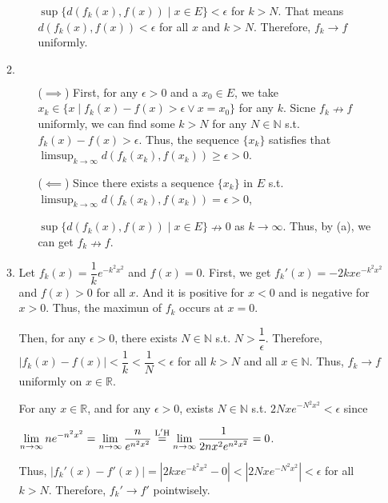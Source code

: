 \documentclass[12pt]{article}
\begin{document}
\begin{enumerate}
\begin{enumerate}
\begin{enumerate}
            $\sup \{ d(f_k(x), f(x)) \mid x \in E\} < \epsilon$ for $k > N$.
            That means $d(f_k(x), f(x)) < \epsilon$ for all $x$ and $k > N$.
            Therefore, $f_k \to f$ uniformly.
        \end{enumerate}
        \newpage

        \item $\ $\begin{enumerate}
            \item[($\implies$)] First, for any $\epsilon > 0$ and a $x_0 \in E$, we take $x_k \in \{ x \mid f_k(x) - f(x) > \epsilon \vee x = x_0\}$ for any $k$.
            Sicne $f_k \nrightarrow f$ uniformly, we can find some $k > N$ for any $N\in \mathbb{N}$ s.t. $f_k(x) - f(x) > \epsilon$.
            Thus, the sequence $\{ x_k\}$ satisfies that $\displaystyle\limsup_{k\to\infty} d(f_k(x_k), f(x_k)) \geq \epsilon > 0$.

            \item[($\impliedby$)] Since there exists a sequence $\{ x_k \}$ in $E$ s.t. $\displaystyle\limsup_{k\to\infty} d(f_k(x_k), f(x_k)) = \epsilon > 0$,

            $\sup \{ d(f_k(x), f(x)) \mid x\in E\} \nrightarrow 0$ as $k \to \infty$.
            Thus, by (a), we can get $f_k \nrightarrow f$.
        \end{enumerate}

        \item Let $f_k(x) = \dfrac{1}{k}e^{-k^2x^2}$ and $f(x) = 0$.
        First, we get $f_k'(x) = -2kxe^{-k^2x^2}$ and $f(x) > 0$ for all $x$.
        And it is positive for $x < 0$ and is negative for $x > 0$.
        Thus, the maximun of $f_k$ occurs at $x = 0$.
        
        Then, for any $\epsilon > 0$, there exists $N \in \mathbb{N}$ s.t. $N > \dfrac{1}{\epsilon}$.
        Therefore, $|f_k(x) - f(x)| < \dfrac{1}{k} < \dfrac{1}{N} < \epsilon$ for all $k > N$ and all $x\in \mathbb{N}$.
        Thus, $f_k \to f$ uniformly on $x \in \mathbb{R}$.

        For any $x \in \mathbb{R}$, and for any $\epsilon > 0$, exists $N \in \mathbb{N}$
        s.t. $2Nxe^{-N^2x^2} < \epsilon$ since 
        
        $\displaystyle\lim_{n\to\infty} ne^{-n^2x^2} = \displaystyle\lim_{n\to\infty} \dfrac{n}{e^{n^2x^2}} \overset{\rm L'H}{=} \displaystyle\lim_{n\to\infty} \dfrac{1}{2nx^2e^{n^2x^2}} = 0$.

        Thus, $|f_k'(x) - f'(x)| = |2kxe^{-k^2x^2} - 0| < |2Nxe^{-N^2x^2}| < \epsilon$ for all $k > N$.
        Therefore, $f_k' \to f'$ pointwisely.


\end{enumerate}
\end{enumerate}
\end{document}
